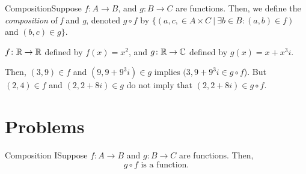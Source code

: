             \begin{definition}
                {Composition}Suppose \(f\colon A \rightarrow B\), and \(g\colon B\rightarrow C\) are functions. Then, we define the \textit{composition} of \textit{f} and \textit{g}, denoted \(g\circ f\) by \(\{(a,c, \in A\times C \ | \ \exists b\in B \colon (a,b)\in f)\) and \((b,c) \in g\}\).
            \end{definition}

            \begin{example}
                \(f \colon \mathbb{R} \rightarrow \mathbb{R}\) defined by \(f(x) = x^2\), and \(g \colon \mathbb{R} \rightarrow \mathbb{C}\) defined by \(g(x) = x + x^3i\). 
            \end{example}
            Then, \((3,9) \in f\) and \((9,9 + 9^3i) \in g\) implies \((3,9 + 9^3i \in g \circ f\)). But \((2,4)\in f\) and \((2,2 + 8i) \in g\) do not imply that \((2,2+8i)\in g\circ f\). \\

        \section{Problems}        


            \begin{exercise}
                {Composition I}Suppose \(f\colon A \rightarrow B\) and \(g\colon B \rightarrow C\) are functions. Then, \[g\circ f \text{ is a function}.\]
            \end{exercise}


